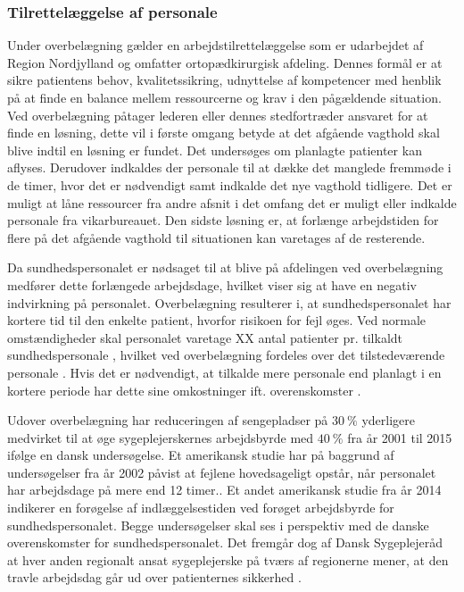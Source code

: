 \subsubsection{Tilrettelæggelse af personale}
Under overbelægning gælder en arbejdstilrettelæggelse som er udarbejdet af Region Nordjylland og omfatter ortopædkirurgisk afdeling. Dennes formål er at sikre patientens behov, kvalitetssikring, udnyttelse af kompetencer med henblik på at finde en balance mellem ressourcerne og krav i den pågældende situation. Ved overbelægning påtager lederen eller dennes stedfortræder ansvaret for at finde en løsning, dette vil i første omgang betyde at det afgående vagthold skal blive indtil en løsning er fundet. Det undersøges om planlagte patienter kan aflyses. Derudover indkaldes der personale til at dække det manglede fremmøde i de timer, hvor det er nødvendigt samt indkalde det nye vagthold tidligere. Det er muligt at låne ressourcer fra andre afsnit i det omfang det er muligt eller indkalde personale fra vikarbureauet. Den sidste løsning er, at forlænge arbejdstiden for flere på det afgående vagthold til situationen kan varetages af de resterende. \cite{Bjerg2016}


Da sundhedspersonalet er nødsaget til at blive på afdelingen ved overbelægning medfører dette forlængede arbejdsdage, hvilket viser sig at have en negativ indvirkning på personalet.\cite{Kjeldsen2015} \cite{Dinges2004} Overbelægning resulterer i, at sundhedspersonalet har kortere tid til den enkelte patient, hvorfor risikoen for fejl øges. Ved normale omstændigheder skal personalet varetage XX antal patienter pr. tilkaldt sundhedspersonale , hvilket ved overbelægning fordeles over det tilstedeværende personale . Hvis det er nødvendigt, at tilkalde mere personale end planlagt i en kortere periode har dette sine omkostninger ift. overenskomster . 


Udover overbelægning har reduceringen af sengepladser på $30~\%$ yderligere medvirket til at øge sygeplejerskernes arbejdsbyrde med $40~\%$ fra år 2001 til 2015 ifølge en dansk undersøgelse. Et amerikansk studie har på baggrund af undersøgelser fra år 2002 påvist at fejlene hovedsageligt opstår, når personalet har arbejdsdage på mere end 12 timer.\cite{Dinges2004}. Et andet amerikansk studie fra år 2014 indikerer en forøgelse af indlæggelsestiden ved forøget arbejdsbyrde for sundhedspersonalet\cite{Elliott2014}. Begge undersøgelser skal ses i perspektiv med de danske overenskomster for sundhedspersonalet. Det fremgår dog af Dansk Sygeplejeråd at hver anden regionalt ansat sygeplejerske på tværs af regionerne mener, at den travle arbejdsdag går ud over patienternes sikkerhed \cite{Kjeldsen2015}. 



